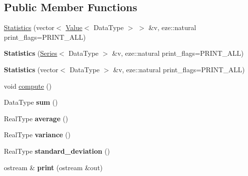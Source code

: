 \subsection*{Public Member Functions}
\begin{DoxyCompactItemize}
\item 
\hyperlink{classez_1_1maths_1_1Statistics_aa1a3aade13e58b388d48380cd0d44374}{Statistics} (vector$<$ \hyperlink{classez_1_1maths_1_1Value}{Value}$<$ Data\+Type $>$ $>$ \&v, eze\+::natural print\+\_\+flags=P\+R\+I\+N\+T\+\_\+\+A\+LL)
\item 
\mbox{\label{classez_1_1maths_1_1Statistics_acbfacb0236c78ff590aa9e9e9aaaa9d4}} 
{\bfseries Statistics} (\hyperlink{classez_1_1maths_1_1Series}{Series}$<$ Data\+Type $>$ \&v, eze\+::natural print\+\_\+flags=P\+R\+I\+N\+T\+\_\+\+A\+LL)
\item 
\mbox{\label{classez_1_1maths_1_1Statistics_a06b87094064ec772e872bd0b8d1bfc2a}} 
{\bfseries Statistics} (vector$<$ Data\+Type $>$ \&v, eze\+::natural print\+\_\+flags=P\+R\+I\+N\+T\+\_\+\+A\+LL)
\item 
void \hyperlink{classez_1_1maths_1_1Statistics_a3bdb44726f6e8948779f71cdfada0ee4}{compute} ()
\item 
\mbox{\label{classez_1_1maths_1_1Statistics_aa9812d032bc10d7b3c7f7f0f9f7d1fbe}} 
Data\+Type {\bfseries sum} ()
\item 
\mbox{\label{classez_1_1maths_1_1Statistics_a90103d38ca241180bd7e698b03aaaebd}} 
Real\+Type {\bfseries average} ()
\item 
\mbox{\label{classez_1_1maths_1_1Statistics_af89768f7b418ea6942dd6ac10aaf74d7}} 
Real\+Type {\bfseries variance} ()
\item 
\mbox{\label{classez_1_1maths_1_1Statistics_a2a2aabc6fa4b35d6306986b2438157f8}} 
Real\+Type {\bfseries standard\+\_\+deviation} ()
\item 
\mbox{\label{classez_1_1maths_1_1Statistics_a5487e1665a3a5773ec783fc209a1f0af}} 
ostream \& {\bfseries print} (ostream \&out)
\end{DoxyCompactItemize}
